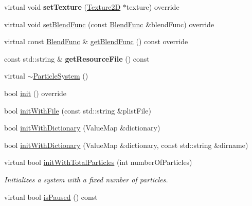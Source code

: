 \begin{DoxyCompactItemize}
\mbox{\label{classParticleSystem_adbac53025a9e1c0d6530891c723e9b41}} 
virtual void {\bfseries set\+Texture} (\hyperlink{classTexture2D}{Texture2D} $\ast$texture) override
\item 
virtual void \hyperlink{classParticleSystem_a72e4f69d65e56ad946a672064a75bd9b}{set\+Blend\+Func} (const \hyperlink{structBlendFunc}{Blend\+Func} \&blend\+Func) override
\item 
virtual const \hyperlink{structBlendFunc}{Blend\+Func} \& \hyperlink{classParticleSystem_aa4d6c0b820b3cfabff92f1e23c77e96f}{get\+Blend\+Func} () const override
\item 
\mbox{\label{classParticleSystem_ad37055b7a3a6a3afd82f07d3a0a03b8c}} 
const std\+::string \& {\bfseries get\+Resource\+File} () const
\item 
virtual \hyperlink{classParticleSystem_a6bc725349a763b9d6817950cde16a93f}{$\sim$\+Particle\+System} ()
\item 
bool \hyperlink{classParticleSystem_a65c05b30432f6e8aeb45ba018f3a8d3f}{init} () override
\item 
bool \hyperlink{classParticleSystem_ae7ac29438534c33f71f36502b75a2c62}{init\+With\+File} (const std\+::string \&plist\+File)
\item 
bool \hyperlink{classParticleSystem_aac8d437cf5d04b3dcc803ffeb1a159f3}{init\+With\+Dictionary} (Value\+Map \&dictionary)
\item 
bool \hyperlink{classParticleSystem_af9ea32fce54ca0962029e64e9558aded}{init\+With\+Dictionary} (Value\+Map \&dictionary, const std\+::string \&dirname)
\item 
\mbox{\label{classParticleSystem_a93c417abb16ff11d24010833f9fc4b47}} 
virtual bool \hyperlink{classParticleSystem_a93c417abb16ff11d24010833f9fc4b47}{init\+With\+Total\+Particles} (int number\+Of\+Particles)
\begin{DoxyCompactList}\small\item\em Initializes a system with a fixed number of particles. \end{DoxyCompactList}\item 
virtual bool \hyperlink{classParticleSystem_a330fdcb2d5d8e035e6955c8105c52659}{is\+Paused} () const
\item 
\mbox{\label{classParticleSystem_a5e3c4e5cbbc3c16591898990a6a1d908}} 

\end{DoxyCompactItemize}
